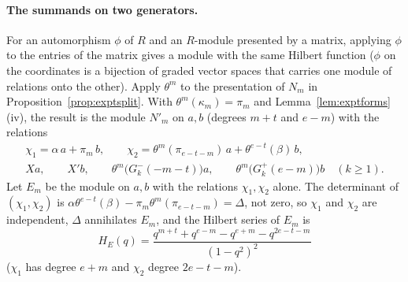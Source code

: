 \documentclass[11pt]{article}
\theoremstyle{definition}
\theoremstyle{remark}
\begin{document}
\paragraph{The summands on two generators.} For an automorphism $\phi$ of $R$ and an $R$-module presented by a matrix, applying $\phi$ to the entries of the matrix gives a module with the same Hilbert function ($\phi$ on the coordinates is a bijection of graded vector spaces that carries one module of relations onto the other). Apply $\theta^m$ to the presentation of $N_m$ in Proposition~\ref{prop:exptsplit}. With $\theta^m(\kappa_m)=\pi_m$ and Lemma~\ref{lem:exptforms}(iv), the result is the module $N'_m$ on $a,b$ (degrees $m+t$ and $e-m$) with the relations
\begin{gather*}
\chi_1=\alpha\,a+\pi_m\,b,\qquad\chi_2=\theta^m(\pi_{e-t-m})\,a+\theta^{e-t}(\beta)\,b,\\
Xa,\qquad X'b,\qquad\theta^m\bigl(G^-_k(-m-t)\bigr)a,\qquad\theta^m\bigl(G^+_k(e-m)\bigr)b\quad(k\ge1).
\end{gather*}
Let $E_m$ be the module on $a,b$ with the relations $\chi_1,\chi_2$ alone. The determinant of $(\chi_1,\chi_2)$ is $\alpha\theta^{e-t}(\beta)-\pi_m\theta^m(\pi_{e-t-m})=\Delta$, not zero, so $\chi_1$ and $\chi_2$ are independent, $\Delta$ annihilates $E_m$, and the Hilbert series of $E_m$ is
\[
H_E(q)=\frac{q^{m+t}+q^{e-m}-q^{e+m}-q^{2e-t-m}}{(1-q^2)^2}
\]
($\chi_1$ has degree $e+m$ and $\chi_2$ degree $2e-t-m$).
\end{document}
